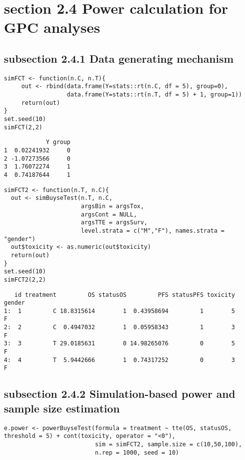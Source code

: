 \documentclass[12pt]{article}
\begin{document}
\section{section 2.4 Power calculation for GPC analyses}
\label{sec:orgb488ac1}
\subsection{subsection 2.4.1 Data generating mechanism}
\label{sec:org79273b0}
\lstset{language=r,label= ,caption= ,captionpos=b,numbers=none}
\begin{lstlisting}
simFCT <- function(n.C, n.T){
     out <- rbind(data.frame(Y=stats::rt(n.C, df = 5), group=0),
                  data.frame(Y=stats::rt(n.T, df = 5) + 1, group=1))
     return(out)
}
set.seed(10)
simFCT(2,2)
\end{lstlisting}

\begin{verbatim}
            Y group
1  0.02241932     0
2 -1.07273566     0
3  1.76072274     1
4  0.74187644     1
\end{verbatim}



\lstset{language=r,label= ,caption= ,captionpos=b,numbers=none}
\begin{lstlisting}
simFCT2 <- function(n.T, n.C){
  out <- simBuyseTest(n.T, n.C,
                      argsBin = argsTox,
                      argsCont = NULL,
                      argsTTE = argsSurv,
                      level.strata = c("M","F"), names.strata = "gender")
  out$toxicity <- as.numeric(out$toxicity)
  return(out)
}
set.seed(10)
simFCT2(2,2)
\end{lstlisting}

\begin{verbatim}
   id treatment         OS statusOS         PFS statusPFS toxicity gender
1:  1         C 18.8315614        1  0.43958694         1        5      F
2:  2         C  0.4947032        1  0.05958343         1        3      F
3:  3         T 29.0185631        0 14.98265076         0        5      F
4:  4         T  5.9442666        1  0.74317252         0        3      F
\end{verbatim}
\subsection{subsection 2.4.2 Simulation-based power and sample size estimation}
\label{sec:org4f632b5}

\lstset{language=r,label= ,caption= ,captionpos=b,numbers=none}
\begin{lstlisting}
e.power <- powerBuyseTest(formula = treatment ~ tte(OS, statusOS, threshold = 5) + cont(toxicity, operator = "<0"),
                          sim = simFCT2, sample.size = c(10,50,100),
                          n.rep = 1000, seed = 10)
\end{lstlisting}
\end{document}
